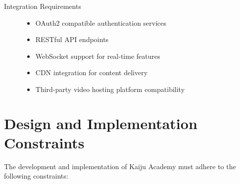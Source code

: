 \documentclass[a4paper, 11pt]{scrreprt}
\begin{document}
\begin{description}
    \item[Integration Requirements]
        \begin{itemize}
            \item OAuth2 compatible authentication services
            \item RESTful API endpoints
            \item WebSocket support for real-time features
            \item CDN integration for content delivery
            \item Third-party video hosting platform compatibility
        \end{itemize}
\end{description}

\section{Design and Implementation Constraints}

The development and implementation of Kaiju Academy must adhere to the following constraints:
\end{document}
